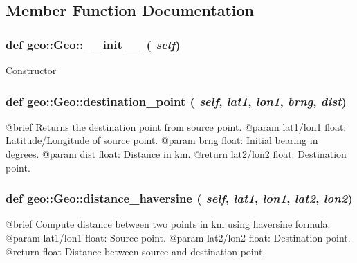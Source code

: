 \subsection{Member Function Documentation}
\hypertarget{classgeo_1_1Geo_a05c4775ff1361a93243f7a4af5322f09}{
\subsubsection[{\_\-\_\-init\_\-\_\-}]{\setlength{\rightskip}{0pt plus 5cm}def geo::Geo::\_\-\_\-init\_\-\_\- ( {\em self})}}
\label{classgeo_1_1Geo_a05c4775ff1361a93243f7a4af5322f09}
\begin{DoxyVerb}
Constructor
\end{DoxyVerb}
 \hypertarget{classgeo_1_1Geo_a5b6b3ddad6ac576c393336349530bccf}{
\subsubsection[{destination\_\-point}]{\setlength{\rightskip}{0pt plus 5cm}def geo::Geo::destination\_\-point ( {\em self}, \/   {\em lat1}, \/   {\em lon1}, \/   {\em brng}, \/   {\em dist})}}
\label{classgeo_1_1Geo_a5b6b3ddad6ac576c393336349530bccf}
\begin{DoxyVerb}@brief Returns the destination point from source point.
    @param {lat1/lon1} float: Latitude/Longitude of source point.
    @param brng float: Initial bearing in degrees.
    @param dist float: Distance in km.
    @return {lat2/lon2} float: Destination point.\end{DoxyVerb}
 \hypertarget{classgeo_1_1Geo_a33eddcd1d8d9c50218da0d4af9c18647}{
\subsubsection[{distance\_\-haversine}]{\setlength{\rightskip}{0pt plus 5cm}def geo::Geo::distance\_\-haversine ( {\em self}, \/   {\em lat1}, \/   {\em lon1}, \/   {\em lat2}, \/   {\em lon2})}}
\label{classgeo_1_1Geo_a33eddcd1d8d9c50218da0d4af9c18647}
\begin{DoxyVerb}@brief Compute distance between two points in km using haversine formula.
    @param {lat1/lon1} float: Source point.
    @param {lat2/lon2} float: Destination point.
    @return float Distance between source and destination point. \end{DoxyVerb}
